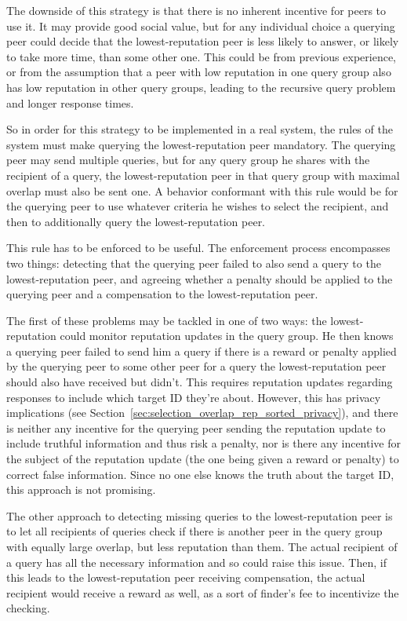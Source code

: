 The downside of this strategy is that there is no inherent incentive for peers
to use it. It may provide good social value, but for any individual choice a
querying peer could decide that the lowest-reputation peer is less likely to
answer, or likely to take more time, than some other one. This could be from
previous experience, or from the assumption that a peer with low reputation in
one query group also has low reputation in other query groups, leading to the
recursive query problem and longer response times.

So in order for this strategy to be implemented in a real system, the rules of
the system must make querying the lowest-reputation peer mandatory. The querying
peer may send multiple queries, but for any query group he shares with the
recipient of a query, the lowest-reputation peer in that query group with
maximal overlap must also be sent one. A behavior conformant with this rule
would be for the querying peer to use whatever criteria he wishes to select the
recipient, and then to additionally query the lowest-reputation peer.

This rule has to be enforced to be useful. The enforcement process encompasses
two things: detecting that the querying peer failed to also send a query to the
lowest-reputation peer, and agreeing whether a penalty should be applied to the
querying peer and a compensation to the lowest-reputation peer.

The first of these problems may be tackled in one of two ways: the
lowest-reputation could monitor reputation updates in the query group. He then
knows a querying peer failed to send him a query if there is a reward or penalty
applied by the querying peer to some other peer for a query the
lowest-reputation peer should also have received but didn't. This requires
reputation updates regarding responses to include which target ID they're about.
However, this has privacy implications (see
Section~\ref{sec:selection_overlap_rep_sorted_privacy}), and there is neither
any incentive for the querying peer sending the reputation update to include
truthful information and thus risk a penalty, nor is there any incentive for the
subject of the reputation update (the one being given a reward or penalty) to
correct false information. Since no one else knows the truth about the target
ID, this approach is not promising.

The other approach to detecting missing queries to the lowest-reputation peer is
to let all recipients of queries check if there is another peer in the query
group with equally large overlap, but less reputation than them. The actual
recipient of a query has all the necessary information and so could raise this
issue. Then, if this leads to the lowest-reputation peer receiving compensation,
the actual recipient would receive a reward as well, as a sort of finder's fee
to incentivize the checking.

